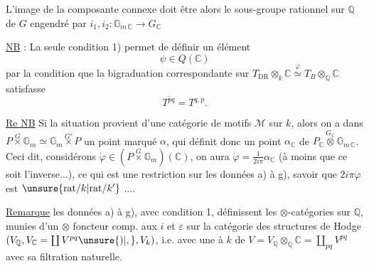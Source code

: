 
L'image  de la composante connexe doit être alors le sous-groupe rationnel sur $\mathbb Q$ de $G$ engendré par $i_1,i_2\colon\mathbb G_{m\,\mathbb C}\longrightarrow G_{\mathbb C}$ 

\uline{NB} : La seule condition 1) permet de définir un élément
\[
\psi\in Q(\mathbb C)
\]
par la condition que la bigraduation correspondante sur $T_{\mathrm{DR}}\otimes_k\mathbb C\overset{\varphi}{\simeq}T_B\otimes_{\mathbb Q}\mathbb C$ satisfasse 
\[
\overline{T^{pq}}=T^{q,p}.
\]

\uline{Re NB} Si  la situation  provient d'une catégorie de motifs $\mathcal M$ sur $k$, alors on a dans $P\overset{G}{\times}\mathbb G_m\simeq\mathbb G_m\overset{G'}{\times}P$ un point marqué $\alpha$, qui définit donc un point $\alpha_{\mathbb C}$ de $P_{\mathbb C}\overset{G_{\mathbb C}}{\otimes}\mathbb G_{m\,\mathbb C}$. Ceci dit, considérons $\dot{\varphi}\in(P\overset{G}{\times}\mathbb G_m)(\mathbb C)$, on aura $\dot{\varphi}=\frac{1}{2i\pi}\alpha_{\mathbb C}$ (à moins que ce soit l'inverse...), ce qui est une restriction  sur les données a) à g), savoir que $2i\pi\dot{\varphi}$ est $\unsure{\mathrm{rat}/k|\mathrm{rat}/k^{\smash{\prime}}}$ ....

\uline{Remarque} les données a) à g), avec condition 1, définissent les  $\otimes$-catégories sur $\mathbb Q$,  munies d'un $\otimes$ foncteur comp. aux $i$ et $\varepsilon$ sur la catégorie des structures de Hodge  $(V_{\mathbb Q},V_{\mathbb C}=\coprod V^{pq}\unsure{)|,},V_k)$, i.e. avec une    à $k$ de  $V=V_{\mathbb Q}\otimes_{\mathbb Q}\mathbb C=\coprod_{pq}V^{pq}$ avec sa filtration naturelle.
{\centering \textsc{}\\
\textit{ }\par}

